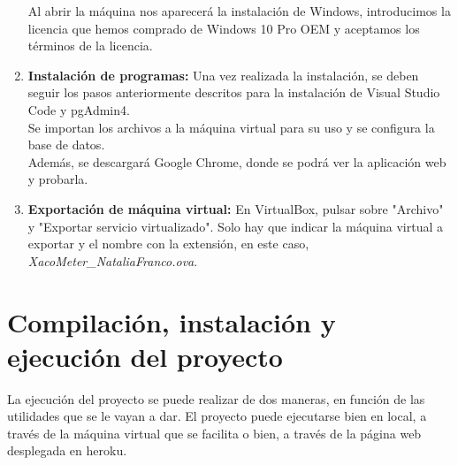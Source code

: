\begin{enumerate}
    
    Al abrir la máquina nos aparecerá la instalación de Windows, introducimos la licencia que hemos comprado de Windows 10 Pro OEM y aceptamos los términos de la licencia.
    \item \textbf{Instalación de programas:}
    Una vez realizada la instalación, se deben seguir los pasos anteriormente descritos para la instalación de Visual Studio Code y pgAdmin4.\\
    Se importan los archivos a la máquina virtual para su uso y se configura la base de datos.\\
    Además, se descargará Google Chrome, donde se podrá ver la aplicación web y probarla.
    \item \textbf{Exportación de máquina virtual:}
    En VirtualBox, pulsar sobre "Archivo" y "Exportar servicio virtualizado". Solo hay que indicar la máquina virtual a exportar y el nombre con la extensión, en este caso, \textit{XacoMeter\_NataliaFranco.ova}.
\end{enumerate}
\section{Compilación, instalación y ejecución del proyecto}
La ejecución del proyecto se puede realizar de dos maneras, en función de las utilidades que se le vayan a dar. El proyecto puede ejecutarse bien en local, a través de la máquina virtual que se facilita o bien, a través de la página web desplegada en heroku.
